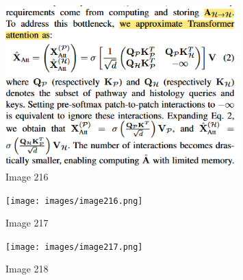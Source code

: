 \documentclass{article}%
\begin{document}
%


\begin{figure}[h!]%
\centering%
\includegraphics[width=0.8\textwidth]{images/image215.png}%
\caption{Image 216}%
\end{figure}

%


\begin{figure}[h!]%
\centering%
\texttt{[image: images/image216.png]}%
\caption{Image 217}%
\end{figure}

%


\begin{figure}[h!]%
\centering%
\texttt{[image: images/image217.png]}%
\caption{Image 218}%
\end{figure}

%
\end{document}
